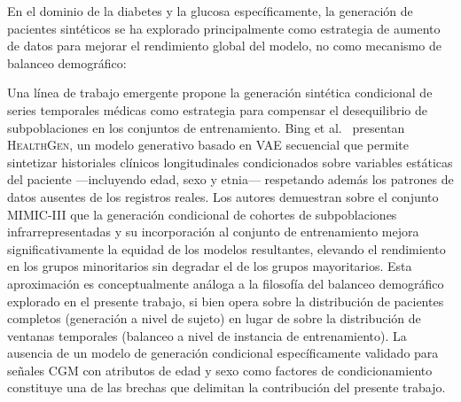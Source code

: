 En el dominio de la diabetes y la glucosa específicamente, la generación de pacientes sintéticos se ha explorado principalmente como estrategia de aumento de datos para mejorar el rendimiento global del modelo, no como mecanismo de balanceo demográfico:

Una línea de trabajo emergente propone la generación sintética condicional de
series temporales médicas como estrategia para compensar el desequilibrio de
subpoblaciones en los conjuntos de entrenamiento. Bing et al.~\cite{bing2022healthgen}
presentan \textsc{HealthGen}, un modelo generativo basado en VAE secuencial que
permite sintetizar historiales clínicos longitudinales condicionados sobre
variables estáticas del paciente —incluyendo edad, sexo y etnia— respetando
además los patrones de datos ausentes de los registros reales. Los autores
demuestran sobre el conjunto MIMIC-III que la generación condicional de cohortes
de subpoblaciones infrarrepresentadas y su incorporación al conjunto de
entrenamiento mejora significativamente la equidad de los modelos resultantes,
elevando el rendimiento en los grupos minoritarios sin degradar el de los grupos
mayoritarios. Esta aproximación es conceptualmente análoga a la filosofía del
balanceo demográfico explorado en el presente trabajo, si bien opera sobre la
distribución de pacientes completos (generación a nivel de sujeto) en lugar de
sobre la distribución de ventanas temporales (balanceo a nivel de instancia de
entrenamiento). La ausencia de un modelo de generación condicional específicamente
validado para señales CGM con atributos de edad y sexo como factores de
condicionamiento constituye una de las brechas que delimitan la contribución del
presente trabajo.


